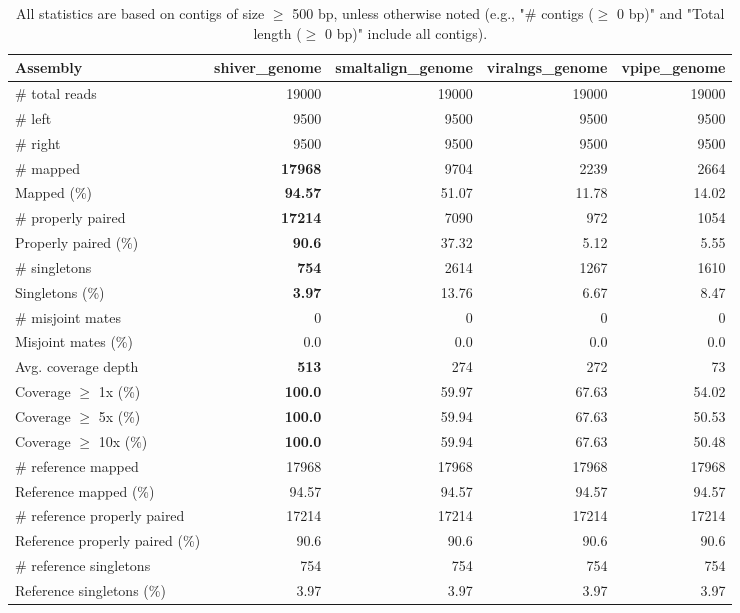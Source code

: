 \documentclass[12pt,a4paper]{article}
\begin{document}
\begin{table}[ht]
\begin{center}
\caption{All statistics are based on contigs of size $\geq$ 500 bp, unless otherwise noted (e.g., "\# contigs ($\geq$ 0 bp)" and "Total length ($\geq$ 0 bp)" include all contigs).}
\begin{tabular}{|l*{4}{|r}|}
\hline
Assembly & shiver\_genome & smaltalign\_genome & viralngs\_genome & vpipe\_genome \\ \hline
\# total reads & 19000 & 19000 & 19000 & 19000 \\ \hline
\# left & 9500 & 9500 & 9500 & 9500 \\ \hline
\# right & 9500 & 9500 & 9500 & 9500 \\ \hline
\# mapped & {\bf 17968} & 9704 & 2239 & 2664 \\ \hline
Mapped (\%) & {\bf 94.57} & 51.07 & 11.78 & 14.02 \\ \hline
\# properly paired & {\bf 17214} & 7090 & 972 & 1054 \\ \hline
Properly paired (\%) & {\bf 90.6} & 37.32 & 5.12 & 5.55 \\ \hline
\# singletons & {\bf 754} & 2614 & 1267 & 1610 \\ \hline
Singletons (\%) & {\bf 3.97} & 13.76 & 6.67 & 8.47 \\ \hline
\# misjoint mates & 0 & 0 & 0 & 0 \\ \hline
Misjoint mates (\%) & 0.0 & 0.0 & 0.0 & 0.0 \\ \hline
Avg. coverage depth & {\bf 513} & 274 & 272 & 73 \\ \hline
Coverage $\geq$ 1x (\%) & {\bf 100.0} & 59.97 & 67.63 & 54.02 \\ \hline
Coverage $\geq$ 5x (\%) & {\bf 100.0} & 59.94 & 67.63 & 50.53 \\ \hline
Coverage $\geq$ 10x (\%) & {\bf 100.0} & 59.94 & 67.63 & 50.48 \\ \hline
\# reference mapped & 17968 & 17968 & 17968 & 17968 \\ \hline
Reference mapped (\%) & 94.57 & 94.57 & 94.57 & 94.57 \\ \hline
\# reference properly paired & 17214 & 17214 & 17214 & 17214 \\ \hline
Reference properly paired (\%) & 90.6 & 90.6 & 90.6 & 90.6 \\ \hline
\# reference singletons & 754 & 754 & 754 & 754 \\ \hline
Reference singletons (\%) & 3.97 & 3.97 & 3.97 & 3.97 \\ \hline

\end{tabular}
\end{center}
\end{table}
\end{document}
